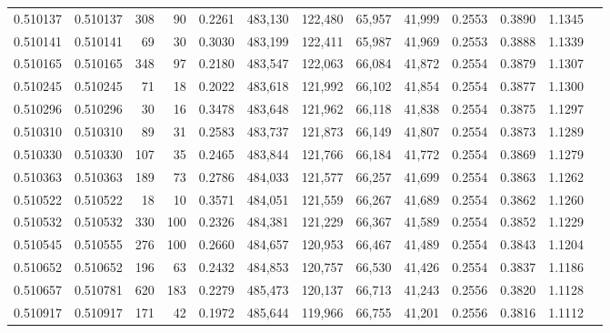 \begin{tabular}{rrrrrrrrrrrrr}
0.510137 & 0.510137 &   308 &    90 &                                     0.2261 & 483,130 & 122,480 &  65,957 &  41,999 & 0.2553 & 0.3890 & 1.1345 \\
0.510141 & 0.510141 &    69 &    30 &                                     0.3030 & 483,199 & 122,411 &  65,987 &  41,969 & 0.2553 & 0.3888 & 1.1339 \\
0.510165 & 0.510165 &   348 &    97 &                                     0.2180 & 483,547 & 122,063 &  66,084 &  41,872 & 0.2554 & 0.3879 & 1.1307 \\
0.510245 & 0.510245 &    71 &    18 &                                     0.2022 & 483,618 & 121,992 &  66,102 &  41,854 & 0.2554 & 0.3877 & 1.1300 \\
0.510296 & 0.510296 &    30 &    16 &                                     0.3478 & 483,648 & 121,962 &  66,118 &  41,838 & 0.2554 & 0.3875 & 1.1297 \\
0.510310 & 0.510310 &    89 &    31 &                                     0.2583 & 483,737 & 121,873 &  66,149 &  41,807 & 0.2554 & 0.3873 & 1.1289 \\
0.510330 & 0.510330 &   107 &    35 &                                     0.2465 & 483,844 & 121,766 &  66,184 &  41,772 & 0.2554 & 0.3869 & 1.1279 \\
0.510363 & 0.510363 &   189 &    73 &                                     0.2786 & 484,033 & 121,577 &  66,257 &  41,699 & 0.2554 & 0.3863 & 1.1262 \\
0.510522 & 0.510522 &    18 &    10 &                                     0.3571 & 484,051 & 121,559 &  66,267 &  41,689 & 0.2554 & 0.3862 & 1.1260 \\
0.510532 & 0.510532 &   330 &   100 &                                     0.2326 & 484,381 & 121,229 &  66,367 &  41,589 & 0.2554 & 0.3852 & 1.1229 \\
0.510545 & 0.510555 &   276 &   100 &                                     0.2660 & 484,657 & 120,953 &  66,467 &  41,489 & 0.2554 & 0.3843 & 1.1204 \\
0.510652 & 0.510652 &   196 &    63 &                                     0.2432 & 484,853 & 120,757 &  66,530 &  41,426 & 0.2554 & 0.3837 & 1.1186 \\
0.510657 & 0.510781 &   620 &   183 &                                     0.2279 & 485,473 & 120,137 &  66,713 &  41,243 & 0.2556 & 0.3820 & 1.1128 \\
0.510917 & 0.510917 &   171 &    42 &                                     0.1972 & 485,644 & 119,966 &  66,755 &  41,201 & 0.2556 & 0.3816 & 1.1112 \\

\end{tabular}
